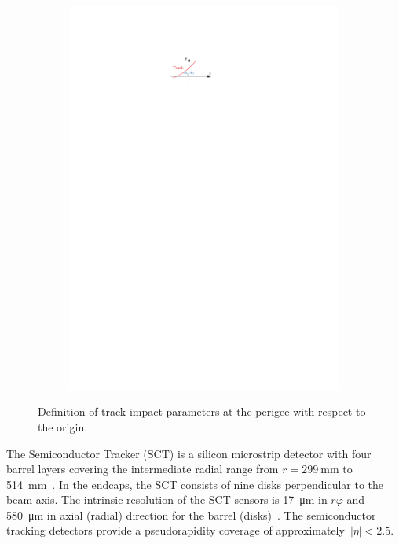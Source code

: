 \begin{figure}[htb]
\begin{subfigure}[t]{0.48\textwidth}
    \centering \includegraphics{./figures/atlas/impact_params_d0.pdf}
    \label{fig:transverse_impact_param}
  \end{subfigure}
  \caption[Definition of track impact parameters]{Definition of track impact
    parameters at the perigee with respect to the origin.}
  \label{fig:impact_params}
\end{figure}

The Semiconductor Tracker (SCT) is a silicon microstrip detector with four
barrel layers covering the intermediate radial range from
$r = \SI{299}{\milli\metre}$ to \SI{514}{mm}~\cite{atlas_detector}. In the
endcaps, the SCT consists of nine disks perpendicular to the beam axis. The
intrinsic resolution of the SCT sensors is \SI{17}{\micro\metre} in $r\varphi$
and \SI{580}{\micro\metre} in axial (radial) direction for the barrel
(disks)~\cite{atlas_detector}. The semiconductor tracking detectors provide a
pseudorapidity coverage of approximately~$|\eta| < 2.5$.


